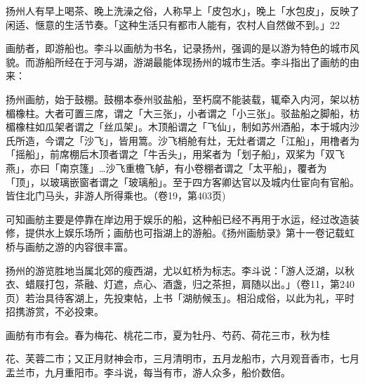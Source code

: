 \vfill
\begin{BookNotes}
\end{BookNotes}

扬州人有早上喝茶、晚上洗澡之俗，人称早上「皮包水」，晚上「水包皮」，反映了闲适、惬意的生活节奏。「这种生活只有都市人能有，农村人自然做不到。」22


画舫者，即游船也。李斗以画舫为书名，记录扬州，强调的是以游为特色的城市风貌。而游船所经在于河与湖，游湖最能体现扬州的城市生活。李斗指出了画舫的由来：

\begin{BookQuote}
扬州画舫，始于鼓棚。鼓棚本泰州驳盐船，至朽腐不能装载，辄牵入内河，架以枋楣橡柱。大者可置三席，谓之「大三张」，小者谓之「小三张」。驳盐船之脚船，枋楣橡柱如瓜架者谓之「丝瓜架」。木顶船谓之「飞仙」，制如苏州酒船，本于城内沙氏所造，今谓之「沙飞」，皆用篙。沙飞梢舱有灶，无灶者谓之「江船」，用橹者为「摇船」，前席棚后木顶者谓之「牛舌头」，用桨者为「划子船」，双桨为「双飞燕」，亦曰「南京篷」…沙飞重檐飞舻，有小卷棚者谓之「太平船」，覆者为「顶」，以玻璃嵌窗者谓之「玻璃船」。至于四方客卿达官以及城内仕宦向有官船。皆住北门马头，非游人所得乘也。（卷19，第403页)
\end{BookQuote}

可知画舫主要是停靠在岸边用于娱乐的船，这种船已经不再用于水运，经过改造装修，提供水上娱乐场所；画舫也可指湖上的游船。《扬州画舫录》第十一卷记载虹桥与画舫之游的内容很丰富。

扬州的游览胜地当属北郊的瘦西湖，尤以虹桥为标志。李斗说：「游人泛湖，以秋衣、蜡屐打包，茶融、灯遮，点心、酒盏，归之茶担，肩随以出。」（卷11，第240页）若治具待客湖上，先投柬帖，上书「湖舫候玉」。相沿成俗，以此为礼，平时招携游赏，不必投柬。

画舫有市有会。春为梅花、桃花二市，夏为牡丹、芍药、荷花三市，秋为桂

\vfill
\begin{BookNotes}
\end{BookNotes}

\noindent 花、芙蓉二市；又正月财神会市，三月清明市，五月龙船市，六月观音香市，七月盂兰市，九月重阳市。李斗说，每当有市，游人众多，船价数倍。

